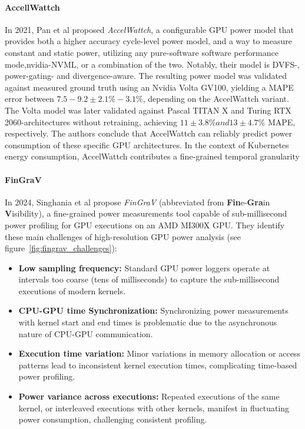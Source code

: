 \paragraph{AccellWattch}
In 2021, Pan et al proposed \textit{AccelWattch}\parencite{kandiah2021accelwattch}, a configurable GPU power model that provides both a higher accuracy cycle-level power model, and a way to measure constant and static power, utilizing any pure-software software performance mode,nvidia-NVML, or a combination of the two. Notably, their model is DVFS-, power-gating- and divergence-aware. The resulting power model was validated against measured ground truth using an Nvidia Volta GV100, yielding a MAPE error between $7.5-9.2 \pm 2.1\%-3.1\%$, depending on the AccelWattch variant. The Volta model was later validated against Pascal TITAN X and Turing RTX 2060-architectures without retraining, achieving $11 \pm 3.8\% and 13 \pm 4.7\%$ MAPE, respectively. The authors conclude that AccelWattch can reliably predict power consumption of these specific GPU architectures. In the context of Kubernetes energy consumption, AccelWattch contributes a fine-grained temporal granularity

\paragraph{FinGraV}
In 2024, Singhania et al propose \textit{FinGraV}\parencite{singhania2024methodology} (abbreviated from \textbf{Fin}e-\textbf{Gra}in \textbf{V}isibility), a fine-grained power measurements tool capable of sub-millisecond power profiling for GPU executions on an AMD MI300X GPU. They identify these main challenges of high-resolution GPU power analysis (see figure~\ref{fig:fingrav_challenges}):
\begin{itemize}
    \item \textbf{Low sampling frequency:} Standard GPU power loggers operate at intervals too coarse (tens of milliseconds) to capture the sub-millisecond executions of modern kernels.
    \item \textbf{CPU-GPU time Synchronization:} Synchronizing power measurements with kernel start and end times is problematic due to the asynchronous nature of CPU-GPU communication.
    \item \textbf{Execution time variation:} Minor variations in memory allocation or access patterns lead to inconsistent kernel execution times, complicating time-based power profiling.
    \item \textbf{Power variance across executions:} Repeated executions of the same kernel, or interleaved executions with other kernels, manifest in fluctuating power consumption, challenging consistent profiling.
\end{itemize}

